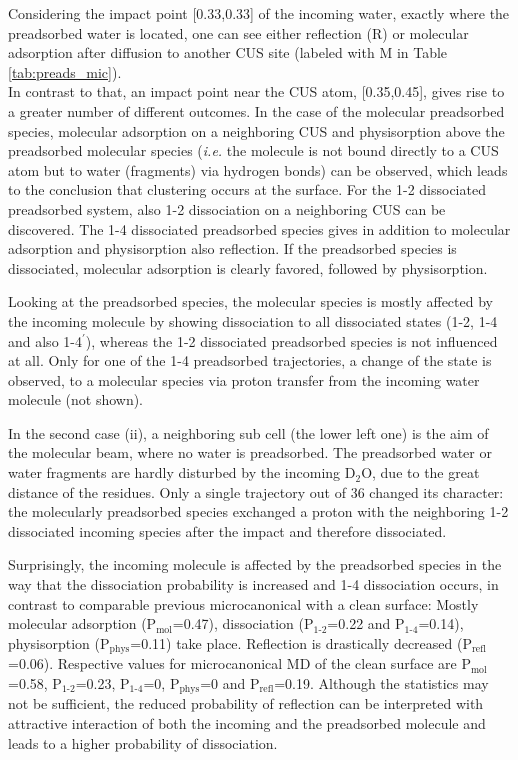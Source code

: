 \documentclass[11pt,DIV=13,BCOR=5mm,a4paper,headinclude]{scrbook}
\begin{document}
Considering the impact point [0.33,0.33] of the incoming water, exactly where the preadsorbed water is located, one can see either reflection (R) or molecular adsorption after diffusion to another CUS site (labeled with M in Table \ref{tab:preads_mic}).\\

In contrast to that, an impact point near the CUS atom, [0.35,0.45], gives rise to a greater number of different outcomes.
In the case of the molecular preadsorbed species, molecular adsorption on a neighboring CUS and physisorption above the preadsorbed molecular species (\textit{i.e.} the molecule is not bound directly to a CUS atom but  to water (fragments) via hydrogen bonds) can be observed, which leads to the conclusion that clustering occurs at the surface.
For the 1-2 dissociated preadsorbed system, also 1-2 dissociation on a neighboring CUS can be discovered.
The 1-4 dissociated preadsorbed species gives in addition to molecular adsorption and physisorption also reflection.
If the preadsorbed species is dissociated, molecular adsorption is clearly favored, followed by physisorption.


Looking at the preadsorbed species, the molecular species is mostly affected by the incoming molecule by showing dissociation to all dissociated states (1-2, 1-4 and also 1-4$^\prime$), whereas the 1-2 dissociated preadsorbed species is not influenced at all.
Only for one of the 1-4 preadsorbed trajectories, a change of the state is observed, to a molecular species via proton transfer from the incoming water molecule (not shown).


In the second case (ii), a neighboring sub cell (the lower left one) is the aim of the molecular beam, where no water is preadsorbed.
The preadsorbed water or water fragments are hardly disturbed by the incoming D$_2$O, due to the great distance of the residues.
Only a single trajectory out of 36 changed its character: the molecularly preadsorbed species exchanged a proton with the neighboring 1-2 dissociated incoming species after the impact and therefore dissociated.


Surprisingly, the incoming molecule is affected by the preadsorbed species in the way that the dissociation probability is increased and 1-4 dissociation occurs, in contrast to comparable previous microcanonical with a clean surface: Mostly molecular adsorption (P$_\textrm{mol}$=0.47), dissociation (P$_\textrm{1-2}$=0.22 and P$_\textrm{1-4}$=0.14), physisorption (P$_\textrm{phys}$=0.11) take place.
Reflection is drastically decreased (P$_\textrm{refl}$=0.06).
Respective values for microcanonical MD of the clean surface are P$_\textrm{mol}$=0.58, P$_\textrm{1-2}$=0.23, P$_\textrm{1-4}$=0, P$_\textrm{phys}$=0 and P$_\textrm{refl}$=0.19.
Although the statistics may not be sufficient, the reduced probability of reflection can be interpreted with attractive interaction of both the incoming and the preadsorbed molecule and leads to a higher probability of dissociation.
\end{document}
